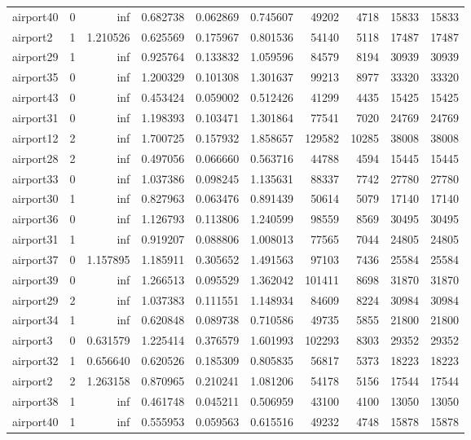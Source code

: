 \begin{longtable}{|l|r|r|r|r|r|r|r|r|r|}
airport40 & 0 & inf & 0.682738 & 0.062869 & 0.745607 & 49202 & 4718 & 15833 & 15833 \\
airport2 & 1 & 1.210526 & 0.625569 & 0.175967 & 0.801536 & 54140 & 5118 & 17487 & 17487 \\
airport29 & 1 & inf & 0.925764 & 0.133832 & 1.059596 & 84579 & 8194 & 30939 & 30939 \\
airport35 & 0 & inf & 1.200329 & 0.101308 & 1.301637 & 99213 & 8977 & 33320 & 33320 \\
airport43 & 0 & inf & 0.453424 & 0.059002 & 0.512426 & 41299 & 4435 & 15425 & 15425 \\
airport31 & 0 & inf & 1.198393 & 0.103471 & 1.301864 & 77541 & 7020 & 24769 & 24769 \\
airport12 & 2 & inf & 1.700725 & 0.157932 & 1.858657 & 129582 & 10285 & 38008 & 38008 \\
airport28 & 2 & inf & 0.497056 & 0.066660 & 0.563716 & 44788 & 4594 & 15445 & 15445 \\
airport33 & 0 & inf & 1.037386 & 0.098245 & 1.135631 & 88337 & 7742 & 27780 & 27780 \\
airport30 & 1 & inf & 0.827963 & 0.063476 & 0.891439 & 50614 & 5079 & 17140 & 17140 \\
airport36 & 0 & inf & 1.126793 & 0.113806 & 1.240599 & 98559 & 8569 & 30495 & 30495 \\
airport31 & 1 & inf & 0.919207 & 0.088806 & 1.008013 & 77565 & 7044 & 24805 & 24805 \\
airport37 & 0 & 1.157895 & 1.185911 & 0.305652 & 1.491563 & 97103 & 7436 & 25584 & 25584 \\
airport39 & 0 & inf & 1.266513 & 0.095529 & 1.362042 & 101411 & 8698 & 31870 & 31870 \\
airport29 & 2 & inf & 1.037383 & 0.111551 & 1.148934 & 84609 & 8224 & 30984 & 30984 \\
airport34 & 1 & inf & 0.620848 & 0.089738 & 0.710586 & 49735 & 5855 & 21800 & 21800 \\
airport3 & 0 & 0.631579 & 1.225414 & 0.376579 & 1.601993 & 102293 & 8303 & 29352 & 29352 \\
airport32 & 1 & 0.656640 & 0.620526 & 0.185309 & 0.805835 & 56817 & 5373 & 18223 & 18223 \\
airport2 & 2 & 1.263158 & 0.870965 & 0.210241 & 1.081206 & 54178 & 5156 & 17544 & 17544 \\
airport38 & 1 & inf & 0.461748 & 0.045211 & 0.506959 & 43100 & 4100 & 13050 & 13050 \\
airport40 & 1 & inf & 0.555953 & 0.059563 & 0.615516 & 49232 & 4748 & 15878 & 15878 \\

\end{longtable}
